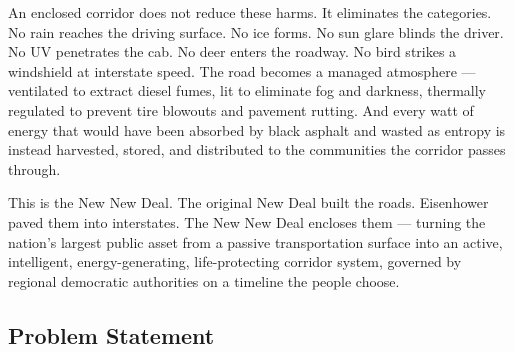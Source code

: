 \documentclass[11pt,letterpaper]{article}
\begin{document}
An enclosed corridor does not reduce these harms. It eliminates the categories. No rain reaches the driving surface. No ice forms. No sun glare blinds the driver. No UV penetrates the cab. No deer enters the roadway. No bird strikes a windshield at interstate speed. The road becomes a managed atmosphere --- ventilated to extract diesel fumes, lit to eliminate fog and darkness, thermally regulated to prevent tire blowouts and pavement rutting. And every watt of energy that would have been absorbed by black asphalt and wasted as entropy is instead harvested, stored, and distributed to the communities the corridor passes through.

This is the New New Deal. The original New Deal built the roads. Eisenhower paved them into interstates. The New New Deal encloses them --- turning the nation's largest public asset from a passive transportation surface into an active, intelligent, energy-generating, life-protecting corridor system, governed by regional democratic authorities on a timeline the people choose.

\subsection{Problem Statement}
\end{document}
